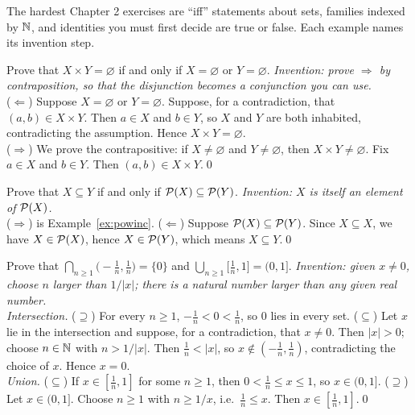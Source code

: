 The hardest Chapter 2 exercises are ``iff'' statements about sets, families indexed by $\mathbb{N}$, and identities you must first decide are true or false. Each example names its invention step.

\begin{bexample}
Prove that $X\times Y=\varnothing$ if and only if $X=\varnothing$ or $Y=\varnothing$.
\solution
\emph{Invention: prove $\Rightarrow$ by contraposition, so that the disjunction becomes a conjunction you can use.}\\
($\Leftarrow$) Suppose $X=\varnothing$ or $Y=\varnothing$. Suppose, for a contradiction, that $(a,b)\in X\times Y$. Then $a\in X$ and $b\in Y$, so $X$ and $Y$ are both inhabited, contradicting the assumption. Hence $X\times Y=\varnothing$.\\
($\Rightarrow$) We prove the contrapositive: if $X\ne\varnothing$ and $Y\ne\varnothing$, then $X\times Y\ne\varnothing$. Fix $a\in X$ and $b\in Y$. Then $(a,b)\in X\times Y$.\qed
\end{bexample}

\begin{bexample}
Prove that $X\subseteq Y$ if and only if $\mathcal{P}(X)\subseteq\mathcal{P}(Y)$.
\solution
\emph{Invention: $X$ is itself an element of $\mathcal{P}(X)$.}\\
($\Rightarrow$) is Example~\ref{ex:powinc}. ($\Leftarrow$) Suppose $\mathcal{P}(X)\subseteq\mathcal{P}(Y)$. Since $X\subseteq X$, we have $X\in\mathcal{P}(X)$, hence $X\in\mathcal{P}(Y)$, which means $X\subseteq Y$.\qed
\end{bexample}

\begin{bexample}
Prove that $\displaystyle\bigcap_{n\ge1}\Big(-\frac1n,\frac1n\Big)=\{0\}$ and $\displaystyle\bigcup_{n\ge1}\Big[\frac1n,1\Big]=(0,1]$.
\solution
\emph{Invention: given $x\ne0$, choose $n$ larger than $1/|x|$; there is a natural number larger than any given real number.}\\
\emph{Intersection.} ($\supseteq$) For every $n\ge1$, $-\frac1n<0<\frac1n$, so $0$ lies in every set. ($\subseteq$) Let $x$ lie in the intersection and suppose, for a contradiction, that $x\ne0$. Then $|x|>0$; choose $n\in\mathbb{N}$ with $n>1/|x|$. Then $\frac1n<|x|$, so $x\notin(-\frac1n,\frac1n)$, contradicting the choice of $x$. Hence $x=0$.\\
\emph{Union.} ($\subseteq$) If $x\in[\frac1n,1]$ for some $n\ge1$, then $0<\frac1n\le x\le1$, so $x\in(0,1]$. ($\supseteq$) Let $x\in(0,1]$. Choose $n\ge1$ with $n\ge1/x$, i.e.\ $\frac1n\le x$. Then $x\in[\frac1n,1]$.\qed
\end{bexample}


